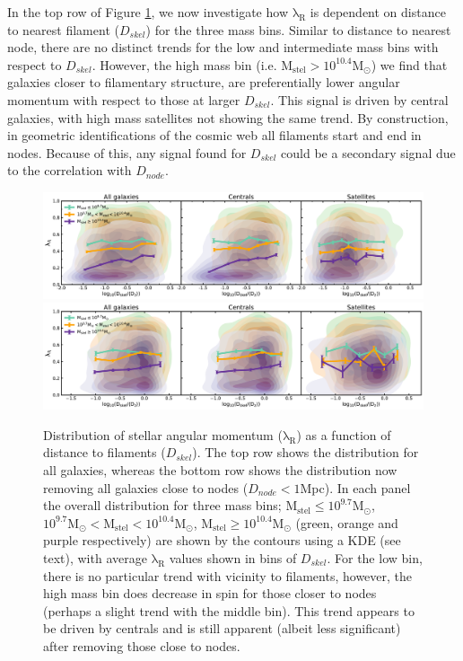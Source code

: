 In the top row of Figure \ref{fig:lambdaR_dskel}, we now investigate how $\mathrm{\lambda_R}$ is dependent on distance to nearest filament ($D_{skel}$) for the three mass bins. Similar to distance to nearest node, there are no distinct trends for the low and intermediate mass bins with respect to $D_{skel}$. However, the high mass bin (i.e. $\mathrm{M_{stel} > 10^{10.4}M_{\odot}}$) we find that galaxies closer to filamentary structure, are preferentially lower angular momentum with respect to those at larger $D_{skel}$. This signal is driven by central galaxies, with high mass satellites not showing the same trend. By construction, in geometric identifications of the cosmic web all filaments start and end in nodes. Because of this, any signal found for $D_{skel}$ could be a secondary signal due to the correlation with $D_{node}$. 

\begin{figure}
    \centering\includegraphics[width=\linewidth]{thesis/latex/cw_spin/lambdaR_dskel_mass_split_3sigma.pdf} \\
    \centering\includegraphics[width=\linewidth]{thesis/latex/cw_spin/lambdaR_dskel_no_node_mass_split_3sigma.pdf}
    \caption{Distribution of stellar angular momentum ($\mathrm{\lambda_R}$) as a function of distance to filaments ($D_{skel}$). The top row shows the distribution for all galaxies, whereas the bottom row shows the distribution now removing all galaxies close to nodes ($D_{node} < 1$Mpc). In each panel the overall distribution for three mass bins; $\mathrm{M_{stel} \leq 10^{9.7} M_{\odot}}$, $\mathrm{10^{9.7}M_{\odot} < M_{stel} < 10^{10.4}M_{\odot}}$, $\mathrm{M_{stel} \geq 10^{10.4}M_{\odot}}$ (green, orange and purple respectively) are shown by the contours using a KDE (see text), with average $\mathrm{\lambda_R}$ values shown in bins of $D_{skel}$. For the low bin, there is no particular trend with vicinity to filaments, however, the high mass bin does decrease in spin for those closer to nodes (perhaps a slight trend with the middle bin). This trend appears to be driven by centrals and is still apparent (albeit less significant) after removing those close to nodes.}
\label{fig:lambdaR_dskel}
\end{figure} 

